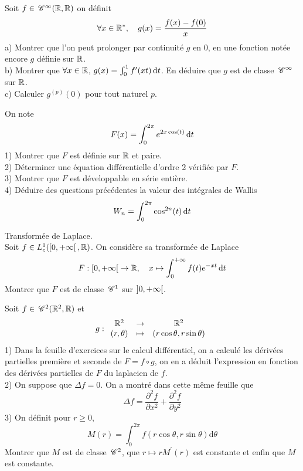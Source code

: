 \begin{exercice}
Soit $f\in \,\mathscr C^{\infty}(\mathbb{R},\mathbb{R})$ on définit
$$ \forall x\in\mathbb{R}^{*}, \quad g(x)=\frac{f(x)-f(0)}{x} $$
a) Montrer que l'on peut prolonger par continuité $g$ en $0$, en une fonction notée encore $g$ définie sur $\mathbb{R}$. \\
b) Montrer que $\forall x\in\mathbb{R}$, $g(x)=\int_{0}^{1}f^{\prime}(xt)\,\mathrm{d}t$. En déduire que $g$ est de classe $\,\mathscr C^{\infty}$ sur $\mathbb{R}$. \\
c) Calculer $g^{(p)}(0)$ pour tout naturel $p$.
\end{exercice}

\begin{exercice}
On note
$$ F(x)=\int_{0}^{2\pi}e^{2x \cos(t)}\,\mathrm{d}t $$
1) Montrer que $F$ est définie sur $\mathbb{R}$ et paire. \\
2) Déterminer une équation différentielle d'ordre 2 vérifiée par $F$. \\
3) Montrer que $F$ est développable en série entière. \\
4) Déduire des questions précédentes la valeur des intégrales de Wallis
$$ W_{n}=\int_{0}^{2\pi}\cos^{2n}(t)\,\mathrm{d}t $$
\end{exercice}

\begin{exercice}
Transformée de Laplace. \\
Soit $f\in L_{c}^{1}(\left[0, +\infty\right[,\mathbb{R})$. On considère sa transformée de Laplace
$$ F: \left[0, +\infty\right[ \to \mathbb{R}, \quad x \mapsto \int_{0}^{+\infty} f(t)e^{-xt}\,\mathrm{d}t $$
Montrer que $F$ est de classe $\,\mathscr C^{1}$ sur $\left]0, +\infty\right[$.
\end{exercice}

\begin{exercice}
Soit $f\in \,\mathscr C^{2}(\mathbb{R}^{2},\mathbb{R})$ et
$$ g: \begin{array}{ccc} \mathbb{R}^{2} & \to & \mathbb{R}^{2} \\ (r,\theta) & \mapsto & (r \cos \theta, r \sin \theta) \end{array} $$
1) Dans la feuille d'exercices sur le calcul différentiel, on a calculé les dérivées partielles première et seconde de $F=f\circ g$, on en a déduit l'expression en fonction des dérivées partielles de $F$ du laplacien de $f$. \\
2) On suppose que $\Delta f=0$. On a montré dans cette même feuille que
$$ \Delta f=\frac{\partial^{2}f}{\partial x^{2}}+\frac{\partial^{2}f}{\partial y^{2}} $$
3) On définit pour $r\ge 0$,
$$ M(r)=\int_{0}^{2\pi}f(r \cos \theta, r \sin \theta)\mathrm{d}\theta $$
Montrer que $M$ est de classe $\,\mathscr C^{2}$, que $r\mapsto rM^{\prime}(r)$ est constante et enfin que $M$ est constante.
\end{exercice}


